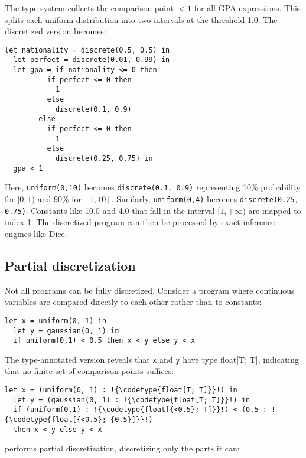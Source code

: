 \documentclass[acmsmall,screen,dvipsnames,x11names,nonacm,anonymous,review]{acmart}
\newcommand{\codetype}[1]{\textcolor{typecolor}{\ttfamily\small#1}}
\begin{document}
\noindent The type system collects the comparison point $<1$ for all GPA expressions. This splits each uniform distribution into two intervals at the threshold 1.0. The discretized version becomes:

\begin{lstlisting}[aboveskip=1em,belowskip=1em]
  let nationality = discrete(0.5, 0.5) in
  let perfect = discrete(0.01, 0.99) in
  let gpa = if nationality <= 0 then
          if perfect <= 0 then
            1
          else
            discrete(0.1, 0.9)
        else
          if perfect <= 0 then
            1
          else
            discrete(0.25, 0.75) in
  gpa < 1
\end{lstlisting}

\noindent Here, \texttt{uniform(0,10)} becomes \texttt{discrete(0.1, 0.9)} representing 10\% probability for $[0,1)$ and 90\% for $[1,10]$. Similarly, \texttt{uniform(0,4)} becomes \texttt{discrete(0.25, 0.75)}. Constants like 10.0 and 4.0 that fall in the interval $[1,+\infty)$ are mapped to index 1. The discretized program can then be processed by exact inference engines like Dice.

\subsection{Partial discretization}

Not all programs can be fully discretized. Consider a program where continuous variables are compared directly to each other rather than to constants:

\begin{lstlisting}[aboveskip=1em,belowskip=1em,escapechar=!]
  let x = uniform(0, 1) in
  let y = gaussian(0, 1) in
  if uniform(0,1) < 0.5 then x < y else y < x
\end{lstlisting}

\noindent The type-annotated version reveals that \texttt{x} and \texttt{y} have type \codetype{float[T; T]}, indicating that no finite set of comparison points suffices:

\begin{lstlisting}[aboveskip=1em,belowskip=1em,escapechar=!]
  let x = (uniform(0, 1) : !{\codetype{float[T; T]}}!) in
  let y = (gaussian(0, 1) : !{\codetype{float[T; T]}}!) in
  if (uniform(0,1) : !{\codetype{float[{<0.5}; T]}}!) < (0.5 : !{\codetype{float[{<0.5}; {0.5}]}}!) 
  then x < y else y < x
\end{lstlisting}

\noindent \Slice{} performs partial discretization, discretizing only the parts it can:
\end{document}
